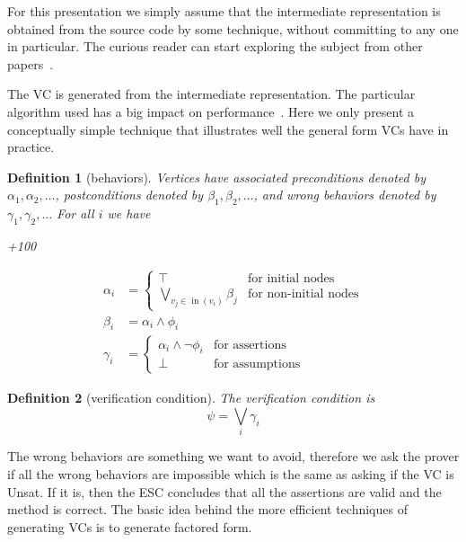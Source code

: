 \documentclass{llncs}
\newtheorem{DEF}{Definition}
\DeclareMathOperator{\preV}{in}
\def\unsat{{\sc Unsat}}
\def\true{\top}
\def\false{\bot}
\def\seq#1{#1_1, #1_2, \ldots}
\begin{document}
For this presentation we simply assume that the intermediate
representation is obtained from the source code by some technique,
without committing to any one in particular. The curious reader 
can start exploring the subject from other 
papers~\cite{boogie,barnett2004voo,leino2005wpu,darvas2005rmc}.

The VC is generated from the intermediate
representation. The particular algorithm used has a big impact
on performance~\cite{flanagan2001aee,leino2005wpu}. Here we
only present a conceptually simple technique that illustrates 
well the general form VCs have in practice.

\begin{DEF}[behaviors]
Vertices have associated \emph{preconditions} denoted by
$\seq\alpha$, \emph{postconditions} denoted by $\seq\beta$, and
\emph{wrong behaviors} denoted by $\seq\gamma$ For all $i$ we have

\penalty+100

\begin{align}
\alpha_i &= 
  \begin{cases}
    \true &\text{for initial nodes} \\
    \bigvee_{v_j\in\preV(v_i)} \beta_j &\text{for non-initial nodes}
  \end{cases} \\
\beta_i &= \alpha_i\land\phi_i \\
\gamma_i &= 
  \begin{cases}
    \alpha_i\land\lnot\phi_i &\text{for assertions} \\
    \false &\text{for assumptions}
  \end{cases}
\end{align}
\end{DEF}

\begin{DEF}[verification condition]
The \emph{verification condition} is
\begin{equation}
\psi=\bigvee_i \gamma_i
\end{equation}
\end{DEF}

\noindent
The wrong behaviors are something we want to avoid, therefore
we ask the prover if all the wrong behaviors are impossible
which is the same as asking if the VC is \unsat.  If it is, then the
ESC concludes that all the assertions are valid and the method is
correct. The basic idea behind the more efficient techniques
of generating VCs is to generate factored form.
\end{document}
